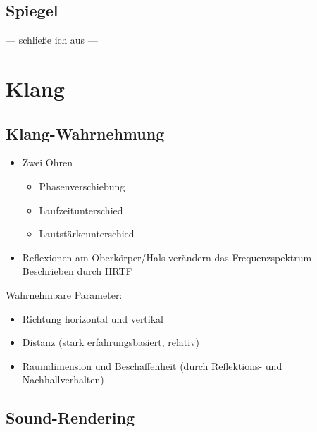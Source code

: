 \documentclass[a4paper, 12pt]{article}
\begin{document}
\subsection{Spiegel}
--- schließe ich aus ---



\section{Klang}


\subsection[Wahrnehmung]{Klang-Wahrnehmung}
\begin{itemize}
  \item Zwei Ohren
    \begin{itemize}
      \renewcommand{\labelitemii}{\(\Rightarrow\)}%
      \item Phasenverschiebung
      \item Laufzeitunterschied
      \item Lautstärkeunterschied
    \end{itemize}
  \item Reflexionen am Oberkörper/Hals verändern das Frequenzspektrum\\
    Beschrieben durch HRTF
\end{itemize}
Wahrnehmbare Parameter:
\begin{itemize}
  \item Richtung horizontal und vertikal
  \item Distanz (stark erfahrungsbasiert, relativ)
  \item Raumdimension und Beschaffenheit (durch Reflektions- und Nachhallverhalten)
\end{itemize}


\subsection[Rendering]{Sound-Rendering}
\end{document}
